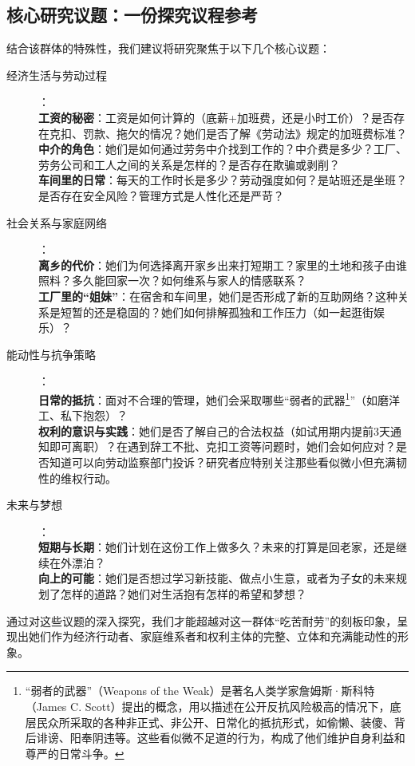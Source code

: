 \documentclass[UTF8]{ctexart}
\begin{document}
\subsection{核心研究议题：一份探究议程参考}
结合该群体的特殊性，我们建议将研究聚焦于以下几个核心议题：
\begin{description}
    \item[经济生活与劳动过程]：\\
    \textbf{工资的秘密}：工资是如何计算的（底薪+加班费，还是小时工价）？是否存在克扣、罚款、拖欠的情况？她们是否了解《劳动法》规定的加班费标准？\\
    \textbf{中介的角色}：她们是如何通过劳务中介找到工作的？中介费是多少？工厂、劳务公司和工人之间的关系是怎样的？是否存在欺骗或剥削？\\
    \textbf{车间里的日常}：每天的工作时长是多少？劳动强度如何？是站班还是坐班？是否存在安全风险？管理方式是人性化还是严苛？
    \item[社会关系与家庭网络]：\\
    \textbf{离乡的代价}：她们为何选择离开家乡出来打短期工？家里的土地和孩子由谁照料？多久能回家一次？如何维系与家人的情感联系？\\
    \textbf{工厂里的“姐妹”}：在宿舍和车间里，她们是否形成了新的互助网络？这种关系是短暂的还是稳固的？她们如何排解孤独和工作压力（如一起逛街娱乐）？
    \item[能动性与抗争策略]：\\
    \textbf{日常的抵抗}：面对不合理的管理，她们会采取哪些“弱者的武器\footnote[1]{“弱者的武器”（Weapons of the Weak）是著名人类学家詹姆斯·斯科特（James C. Scott）提出的概念，用以描述在公开反抗风险极高的情况下，底层民众所采取的各种非正式、非公开、日常化的抵抗形式，如偷懒、装傻、背后诽谤、阳奉阴违等。这些看似微不足道的行为，构成了他们维护自身利益和尊严的日常斗争。}”（如磨洋工、私下抱怨）？\\
    \textbf{权利的意识与实践}：她们是否了解自己的合法权益（如试用期内提前3天通知即可离职）？在遇到辞工不批、克扣工资等问题时，她们会如何应对？是否知道可以向劳动监察部门投诉？研究者应特别关注那些看似微小但充满韧性的维权行动。
    \item[未来与梦想]：\\
    \textbf{短期与长期}：她们计划在这份工作上做多久？未来的打算是回老家，还是继续在外漂泊？\\
    \textbf{向上的可能}：她们是否想过学习新技能、做点小生意，或者为子女的未来规划了怎样的道路？她们对生活抱有怎样的希望和梦想？
\end{description}
通过对这些议题的深入探究，我们才能超越对这一群体“吃苦耐劳”的刻板印象，呈现出她们作为经济行动者、家庭维系者和权利主体的完整、立体和充满能动性的形象。
\end{document}
